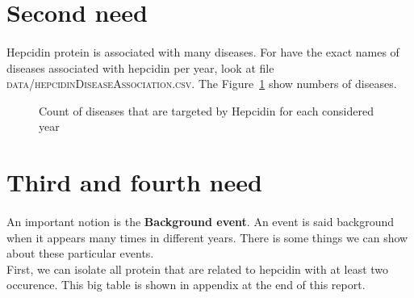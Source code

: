 \documentclass{report} %
\begin{document}
\newpage
\section{Second need}
        \paragraph*{}
        Hepcidin protein is associated with many diseases. For have the exact names of diseases associated with hepcidin per year, 
        look at file \textsc{data/hepcidinDiseaseAssociation.csv}. The Figure~\ref{fig:diseasePerYear} show numbers of diseases.
        \begin{figure}[H] 
                \centering
                \caption{Count of diseases that are targeted by Hepcidin for each considered year}
                \label{fig:diseasePerYear}
        \end{figure}




\newpage
\section{Third and fourth need}
        \paragraph*{}
        An important notion is the \textbf{Background event}. An event is said background when it appears many times in different years.
        There is some things we can show about these particular events. \\
        First, we can isolate all protein that are related to hepcidin with at least two occurence. This big table is shown in 
        appendix at the end of this report.
\end{document}
